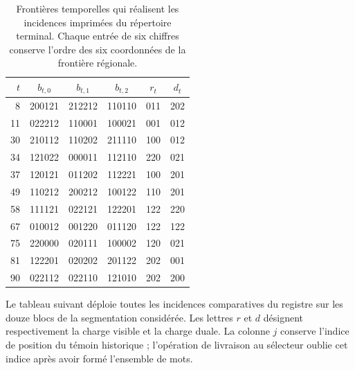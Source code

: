 \begin{table}[htbp]
\centering\small
\begin{tabular}{rccc cc}
\toprule
$t$&$b_{t,0}$&$b_{t,1}$&$b_{t,2}$&$r_t$&$d_t$\\
\midrule
8 &200121&212212&110110&011&202\\
11&022212&110001&100021&001&012\\
30&210112&110202&211110&100&012\\
34&121022&000011&112110&220&021\\
37&120121&011202&112221&100&201\\
49&110212&200212&100122&110&201\\
58&111121&022121&122201&122&220\\
67&010012&001220&011120&122&122\\
75&220000&020111&100002&120&021\\
81&122201&020202&201122&202&001\\
90&022112&022110&121010&202&200\\
\bottomrule
\end{tabular}
\caption{Frontières temporelles qui réalisent les incidences imprimées du
répertoire terminal. Chaque entrée de six chiffres conserve l'ordre des
six coordonnées de la frontière régionale.}
\label{tab:terminal-bandas-testigo}
\end{table}

Le tableau suivant déploie toutes les incidences comparatives du
registre sur les douze blocs de la segmentation considérée. Les
lettres $r$ et $d$ désignent respectivement la charge visible et la charge
duale. La colonne $j$ conserve l'indice de position du témoin historique ;
l'opération de livraison au sélecteur oublie cet indice après avoir formé
l'ensemble de mots.

